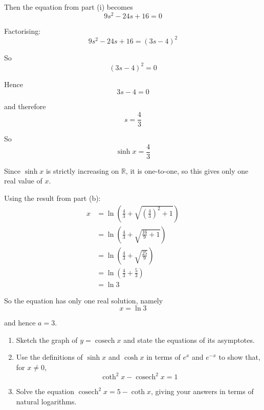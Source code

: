\documentclass[leqno]{article}
\begin{document}
\begin{enumerate}[
  label=\textbf{\arabic*.},
  leftmargin=*,
  topsep=0pt,
  partopsep=0pt,
  parsep=0pt
]
\begin{djsSolution}
\begin{enumerate}[label=\textbf{(\alph*)}]
\begin{enumerate}[label=(\roman*)]
    Then the equation from part (i) becomes
    \[
    9s^2-24s+16=0
    \]

    Factorising:
    \[
    9s^2-24s+16=(3s-4)^2
    \]

    So
    \[
    (3s-4)^2=0
    \]

    Hence
    \[
    3s-4=0
    \]

    and therefore
    \[
    s=\frac{4}{3}
    \]

    So
    \[
    \sinh x=\frac{4}{3}
    \]

    Since $\sinh x$ is strictly increasing on $\mathbb{R}$, it is one-to-one, so this gives only one real value of $x$.

    Using the result from part (b):
    \begin{align*}
    x&=\ln\left(\frac{4}{3}+\sqrt{\left(\frac{4}{3}\right)^2+1}\right)\\
    &=\ln\left(\frac{4}{3}+\sqrt{\frac{16}{9}+1}\right)\\
    &=\ln\left(\frac{4}{3}+\sqrt{\frac{25}{9}}\right)\\
    &=\ln\left(\frac{4}{3}+\frac{5}{3}\right)\\
    &=\ln 3
    \end{align*}

    So the equation has only one real solution, namely
    \[
    x=\ln 3
    \]

    and hence $a=3$.
  \end{enumerate}
\end{enumerate}
\end{djsSolution}


\newpage

\questionitem

\begin{enumerate}[label=\textbf{(\alph*)}]
  \item Sketch the graph of $y=\operatorname{cosech} x$ and state the equations of its asymptotes.  \\
  \item Use the definitions of $\sinh x$ and $\cosh x$ in terms of $e^x$ and $e^{-x}$ to show that, for $x\ne 0$,
  \[
  \coth^2 x - \operatorname{cosech}^2 x = 1
  \]
  \item Solve the equation $\operatorname{cosech}^2 x = 5 - \coth x$, giving your answers in terms of natural logarithms.  \\
\end{enumerate}


\end{enumerate}
\end{document}
